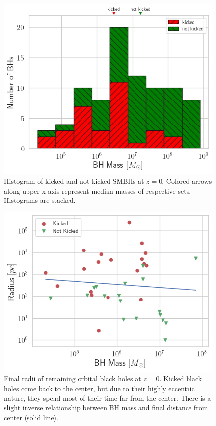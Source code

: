 \documentclass[fleqn,usenatbib,useAMS]{mnras}
\begin{document}
\begin{figure}
\begin{center}
\includegraphics[width=1.0\columnwidth]{plots/kicked_stats.png}
\caption{Histogram of kicked and not-kicked SMBHs at $z=0$.  Colored arrows along upper x-axis represent median masses of respective sets.  Histograms are stacked.}
\label{fig:kicked_stats}
\end{center}
\end{figure}

\begin{figure}
\begin{center}
\includegraphics[width=1.0\columnwidth]{plots/Final_Radius_v_Mass_of_Orbiting_BHs.png}
\caption{Final radii of remaining orbital black holes at $z=0$.  Kicked black holes come back to the center, but due to their highly eccentric nature, they spend most of their time far from the center.  There is a slight inverse relationship between BH mass and final distance from center (solid line).}
\label{fig:mvr}
\end{center}
\end{figure}
\end{document}
